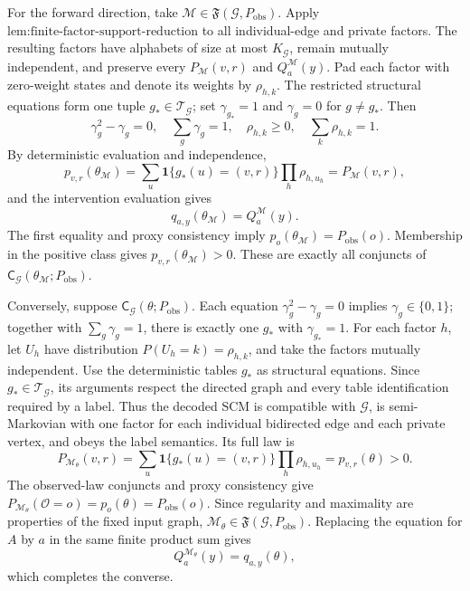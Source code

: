 For the forward direction, take \(\mathcal M\in\mathfrak F(\mathcal G,P_{\mathrm{obs}})\). Apply \(\text{lem:finite-factor-support-reduction}\) to all individual-edge and private factors. The resulting factors have alphabets of size at most \(K_{\mathcal G}\), remain mutually independent, and preserve every \(P_{\mathcal M}(v,r)\) and \(Q_a^{\mathcal M}(y)\). Pad each factor with zero-weight states and denote its weights by \(\rho_{h,k}\). The restricted structural equations form one tuple \(g_*\in\mathcal T_{\mathcal G}\); set \(\gamma_{g_*}=1\) and \(\gamma_g=0\) for \(g\neq g_*\). Then
\[
\gamma_g^2-\gamma_g=0,
\quad
\sum_g\gamma_g=1,
\quad
\rho_{h,k}\geq0,
\quad
\sum_k\rho_{h,k}=1.
\]
By deterministic evaluation and independence,
\[
p_{v,r}(\theta_{\mathcal M})
=\sum_{u}\mathbf 1\{g_*(u)=(v,r)\}\prod_h\rho_{h,u_h}
=P_{\mathcal M}(v,r),
\]
and the intervention evaluation gives
\[
q_{a,y}(\theta_{\mathcal M})=Q_a^{\mathcal M}(y).
\]
The first equality and proxy consistency imply \(p_o(\theta_{\mathcal M})=P_{\mathrm{obs}}(o)\). Membership in the positive class gives \(p_{v,r}(\theta_{\mathcal M})>0\). These are exactly all conjuncts of \(\mathsf C_{\mathcal G}(\theta_{\mathcal M};P_{\mathrm{obs}})\).

Conversely, suppose \(\mathsf C_{\mathcal G}(\theta;P_{\mathrm{obs}})\). Each equation \(\gamma_g^2-\gamma_g=0\) implies \(\gamma_g\in\{0,1\}\); together with \(\sum_g\gamma_g=1\), there is exactly one \(g_*\) with \(\gamma_{g_*}=1\). For each factor \(h\), let \(U_h\) have distribution \(P(U_h=k)=\rho_{h,k}\), and take the factors mutually independent. Use the deterministic tables \(g_*\) as structural equations. Since \(g_*\in\mathcal T_{\mathcal G}\), its arguments respect the directed graph and every table identification required by a label. Thus the decoded SCM is compatible with \(\mathcal G\), is semi-Markovian with one factor for each individual bidirected edge and each private vertex, and obeys the label semantics. Its full law is
\[
P_{\mathcal M_\theta}(v,r)
=\sum_u\mathbf 1\{g_*(u)=(v,r)\}\prod_h\rho_{h,u_h}
=p_{v,r}(\theta)>0.
\]
The observed-law conjuncts and proxy consistency give \(P_{\mathcal M_\theta}(\mathcal O=o)=p_o(\theta)=P_{\mathrm{obs}}(o)\). Since regularity and maximality are properties of the fixed input graph, \(\mathcal M_\theta\in\mathfrak F(\mathcal G,P_{\mathrm{obs}})\). Replacing the equation for \(A\) by \(a\) in the same finite product sum gives
\[
Q_a^{\mathcal M_\theta}(y)=q_{a,y}(\theta),
\]
which completes the converse.